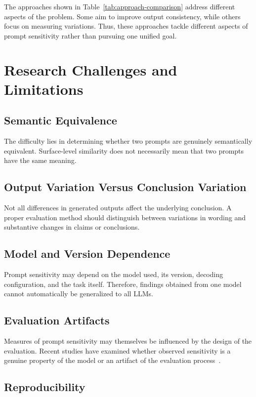 \documentclass[acmsmall,screen,review]{acmart}
\begin{document}
The approaches shown in Table~\ref{tab:approach-comparison} address different aspects of the problem. Some aim to improve output consistency, while others focus on measuring variations. Thus, these approaches tackle different aspects of prompt sensitivity rather than pursuing one unified goal.

\section{Research Challenges and Limitations}
\label{sec:challenges}

\subsection{Semantic Equivalence}

The difficulty lies in determining whether two prompts are genuinely semantically equivalent. Surface-level similarity does not necessarily mean that two prompts have the same meaning.

\subsection{Output Variation Versus Conclusion Variation}

Not all differences in generated outputs affect the underlying conclusion. A proper evaluation method should distinguish between variations in wording and substantive changes in claims or conclusions.

\subsection{Model and Version Dependence}

Prompt sensitivity may depend on the model used, its version, decoding configuration, and the task itself. Therefore, findings obtained from one model cannot automatically be generalized to all LLMs.

\subsection{Evaluation Artifacts}

Measures of prompt sensitivity may themselves be influenced by the design of the evaluation. Recent studies have examined whether observed sensitivity is a genuine property of the model or an artifact of the evaluation process~\cite{hua2025}.

\subsection{Reproducibility}
\end{document}

